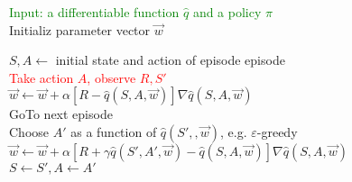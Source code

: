 \documentclass{standalone}
\begin{document}
\pagestyle{empty}
\begin{algorithm}[H]
  \textcolor{Green}{Input: a differentiable function $\hat{q}$ and a policy $\pi$}\\
  \textcolor{Cerulean}{Initializ parameter vector $\vec{w}$} \\
 {
	$S,A \leftarrow$ initial state and action of episode
	episode\\
   {
  	\textcolor{red}{Take action $A$, observe $R, S'$}\\
  	 {
  		$\vec{w} \leftarrow \vec{w} + \alpha [R-\hat{q}(S,A,\vec{w})]\nabla\hat{q}(S,A,\vec{w})$\\
  		GoTo next episode\\
  	} 
  	Choose $A'$ as a function of $\hat{q}(S', ,\vec{w})$, e.g. $\varepsilon$-greedy\\
  	$\vec{w} \leftarrow \vec{w} + \alpha [R + \gamma \hat{q}(S',A',\vec{w}) -\hat{q}(S,A,\vec{w})]\nabla\hat{q}(S,A,\vec{w})$\\
  	$S \leftarrow S', A \leftarrow A'$
  }
  
}
\end{algorithm}
\end{document}
